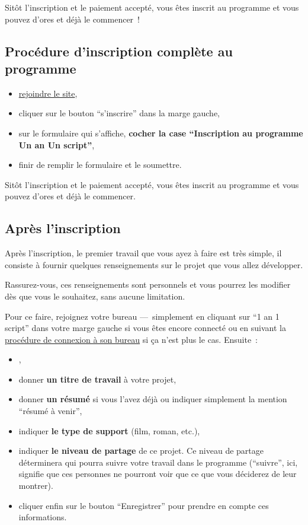 Sitôt l'inscription et le paiement accepté, vous êtes inscrit au programme et vous pouvez d'ores et déjà le commencer~{}!

\subsection{Procédure d'inscription complète au programme}\hypertarget{procedure-inscription-complete}{}\label{procedure-inscription-complete}

\begin{itemize}
\item \hyperlink{rejoindre-site}{rejoindre le site},
\item cliquer sur le bouton ``s'inscrire'' dans la marge gauche,
\item sur le formulaire qui s'affiche, \textbf{cocher la case ``Inscription au programme Un an Un script''},
\item finir de remplir le formulaire et le soumettre.
\end{itemize}

Sitôt l'inscription et le paiement accepté, vous êtes inscrit au programme et vous pouvez d'ores et déjà le commencer.

\subsection{Après l'inscription}\hypertarget{premiers-pas-apres-inscription}{}\label{premiers-pas-apres-inscription}

Après l'inscription, le premier travail que vous ayez à faire est très simple, il consiste à fournir quelques renseignements sur le projet que vous allez développer.

Rassurez-vous, ces renseignements sont personnels et vous pourrez les modifier dès que vous le souhaitez, sans aucune limitation.

Pour ce faire, rejoignez votre bureau —~{}simplement en cliquant sur ``1 an 1 script'' dans votre marge gauche si vous êtes encore connecté ou en suivant la \hyperlink{rejoindre-bureau-travail}{procédure de connexion à son bureau} si ça n'est plus le cas. Ensuite~{}:

\begin{itemize}
\item {},
\item donner \textbf{un titre de travail} à votre projet,
\item donner \textbf{un résumé} si vous l'avez déjà ou indiquer simplement la mention ``résumé à venir'',
\item indiquer \textbf{le type de support} (film, roman, etc.),
\item indiquer \textbf{le niveau de partage} de ce projet. Ce niveau de partage déterminera qui pourra suivre votre travail dans le programme (``suivre'', ici, signifie que ces personnes ne pourront voir que ce que vous déciderez de leur montrer).
\item cliquer enfin sur le bouton ``Enregistrer'' pour prendre en compte ces informations.
\end{itemize}

